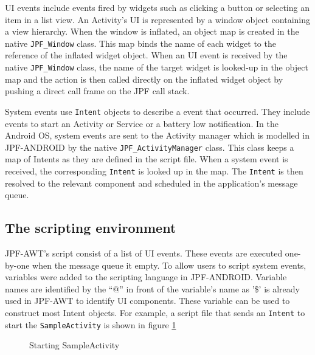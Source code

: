 \documentclass{acm_proc_article-sp}
\begin{document}
UI events include events fired by widgets such as clicking a button or selecting an item in a list view. An
Activity's UI is represented by a window object containing a view hierarchy. When the window is inflated, an object map is created in the
native \texttt{JPF\_Window} class. This map binds the name of each widget to the reference of the inflated widget object. When an UI event
is received by the native \texttt{JPF\_Window} class, the name of the target widget is looked-up in the object map and the action is then
called directly on the inflated widget object by pushing a direct call frame on the JPF call stack. 

System events use \texttt{Intent} objects to describe a event that occurred. They include events to start an Activity or Service or a
battery low notification. In the Android OS, system events are sent to the Activity manager which is modelled in JPF-ANDROID by the native
\texttt{JPF\_ActivityManager} class. This class keeps a map of Intents as they are defined in the script file. When a system event is
received, the corresponding \texttt{Intent} is looked up in the map. The \texttt{Intent} is then resolved to the relevant
component and scheduled in the application's message queue.

\subsection{The scripting environment}
JPF-AWT's script consist of a list of UI events. These events are executed one-by-one when the message queue it empty. To allow users to
script system events, variables were added to the scripting language in JPF-ANDROID. Variable names are identified by the ``@'' in front of
the variable's name as '\$' is already used in JPF-AWT to identify UI components. These variable can be used to construct most Intent
objects. For example, a script file that sends an \texttt{Intent} to start the \texttt{SampleActivity} is shown in figure \ref{fig:start}
\begin{figure}
\vspace{-18pt}
\caption{Starting SampleActivity}
\label{fig:start}
\end{figure}
\end{document}
